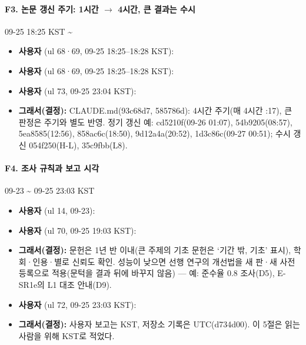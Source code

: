 \paragraph{F3. 논문 갱신 주기: 1시간 $\rightarrow$ 4시간, 큰 결과는 수시}
{\small 09-25 18:25 KST \textasciitilde{}}
\begin{itemize}
  \item \textbf{사용자} (ul 68·69, 09-25 18:25--18:28 KST): 
  \item \textbf{사용자} (ul 68·69, 09-25 18:25--18:28 KST): 
  \item \textbf{사용자} (ul 73, 09-25 23:04 KST): 
  \item \textbf{그래서(결정):} CLAUDE.md(93c68d7, 585786d): 4시간 주기(매 4시간 :17), 큰 판정은 주기와 별도 반영. 정기 갱신 예: cd5210f(09-26 01:07), 54b9205(08:57), 5ea8585(12:56), 858ac6c(18:50), 9d12a4a(20:52), 1d3c86c(09-27 00:51); 수시 갱신 054f250(H-L), 35c9fbb(L8).
\end{itemize}

\paragraph{F4. 조사 규칙과 보고 시각}
{\small 09-23 \textasciitilde{} 09-25 23:03 KST}
\begin{itemize}
  \item \textbf{사용자} (ul 14, 09-23): 
  \item \textbf{사용자} (ul 70, 09-25 19:03 KST): 
  \item \textbf{그래서(결정):} 문헌은 1년 반 이내(큰 주제의 기초 문헌은 `기간 밖, 기초' 표시), 학회·인용·별로 신뢰도 확인. 성능이 낮으면 선행 연구의 개선법을 새 판·새 사전 등록으로 적용(문턱을 결과 뒤에 바꾸지 않음) --- 예: 준수율 0.8 조사(D5), E-SR1e의 L1 대조 안내(D9).
  \item \textbf{사용자} (ul 72, 09-25 23:03 KST): 
  \item \textbf{그래서(결정):} 사용자 보고는 KST, 저장소 기록은 UTC(d734d00). 이 5절은 읽는 사람을 위해 KST로 적었다.
\end{itemize}

